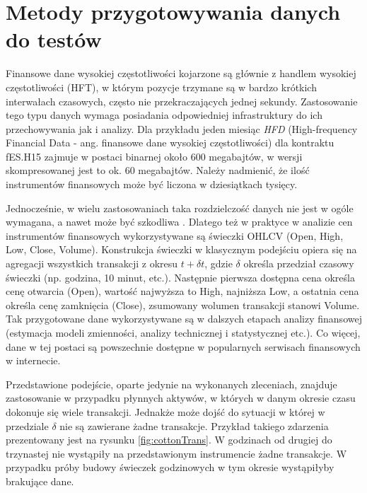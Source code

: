 \documentclass[a4paper,12pt,openany, DIV=calc, headsepline]{scrbook}
\begin{document}
\section{Metody przygotowywania danych do testów}

Finansowe dane wysokiej częstotliwości kojarzone są głównie z handlem wysokiej częstotliwości (HFT), w którym pozycje trzymane są w bardzo krótkich interwałach czasowych, często nie przekraczających jednej sekundy. Zastosowanie tego typu danych wymaga posiadania odpowiedniej infrastruktury do ich przechowywania jak i analizy. Dla przykładu jeden miesiąc \emph{HFD} (High-frequency Financial Data - ang. finansowe dane wysokiej częstotliwości) dla kontraktu fES.H15 zajmuje w postaci binarnej około 600 megabajtów, w wersji skompresowanej jest to ok. 60 megabajtów. Należy nadmienić, że ilość instrumentów finansowych może być liczona w dziesiątkach tysięcy.

Jednocześnie, w wielu zastosowaniach taka rozdzielczość danych nie jest w ogóle wymagana, a nawet może być szkodliwa \citep{doman2009modelowanie}. Dlatego też w praktyce w analizie cen instrumentów finansowych wykorzystywane są świeczki OHLCV (Open, High, Low, Close, Volume). Konstrukcja świeczki w klasycznym podejściu opiera się na agregacji wszystkich transakcji z okresu $t + \delta t$, gdzie $\delta$ określa przedział czasowy świeczki (np. godzina, 10 minut, etc.). Następnie pierwsza dostępna cena określa cenę otwarcia (Open), wartość najwyższa to High, najniższa Low, a ostatnia cena określa cenę zamknięcia (Close), zsumowany wolumen transakcji stanowi Volume. Tak przygotowane dane wykorzystywane są w dalszych etapach analizy finansowej (estymacja modeli zmienności, analizy technicznej i statystycznej etc.). Co więcej, dane w tej postaci są powszechnie dostępne w popularnych serwisach finansowych w internecie.

Przedstawione podejście, oparte jedynie na wykonanych zleceniach, znajduje zastosowanie w przypadku płynnych aktywów, w których w danym okresie czasu dokonuje się wiele transakcji. Jednakże może dojść do sytuacji w której w przedziale $\delta$ nie są zawierane żadne transakcje. Przykład takiego zdarzenia prezentowany jest na rysunku \ref{fig:cottonTrans}. W godzinach od drugiej do trzynastej nie wystąpiły na przedstawionym instrumencie żadne transakcje. W przypadku próby budowy świeczek godzinowych w tym okresie wystąpiłyby brakujące dane.
\end{document}
